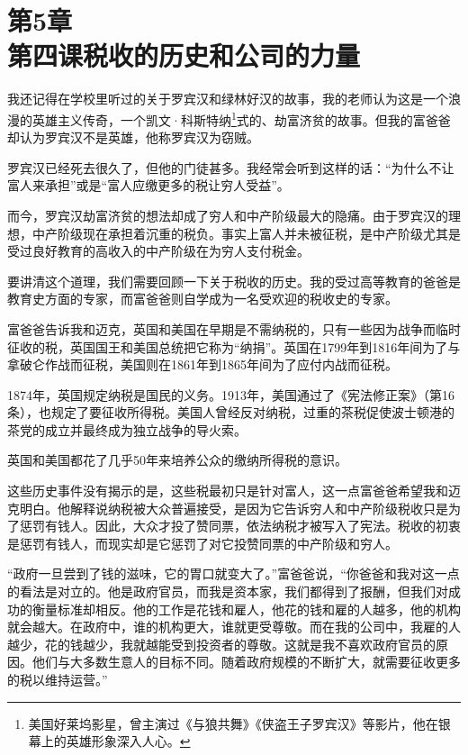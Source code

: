 \section[第5章\q 第四课\q 税收的历史和公司的力量]{第5章\\第四课\q 税收的历史和公司的力量}

我还记得在学校里听过的关于罗宾汉和绿林好汉的故事，我的老师认为这是一个浪漫的英雄主义传奇，一个凯文·科斯特纳\footnote{美国好莱坞影星，曾主演过《与狼共舞》《侠盗王子罗宾汉》等影片，他在银幕上的英雄形象深入人心。}式的、劫富济贫的故事。但我的富爸爸却认为罗宾汉不是英雄，他称罗宾汉为窃贼。

罗宾汉已经死去很久了，但他的门徒甚多。我经常会听到这样的话：“为什么不让富人来承担”或是“富人应缴更多的税让穷人受益”。

而今，罗宾汉劫富济贫的想法却成了穷人和中产阶级最大的隐痛。由于罗宾汉的理想，中产阶级现在承担着沉重的税负。事实上富人并未被征税，是中产阶级尤其是受过良好教育的高收入的中产阶级在为穷人支付税金。

要讲清这个道理，我们需要回顾一下关于税收的历史。我的受过高等教育的爸爸是教育史方面的专家，而富爸爸则自学成为一名受欢迎的税收史的专家。

富爸爸告诉我和迈克，英国和美国在早期是不需纳税的，只有一些因为战争而临时征收的税，英国国王和美国总统把它称为“纳捐”。英国在1799年到1816年间为了与拿破仑作战而征税，美国则在1861年到1865年间为了应付内战而征税。

1874年，英国规定纳税是国民的义务。1913年，美国通过了《宪法修正案》（第16条），也规定了要征收所得税。美国人曾经反对纳税，过重的茶税促使波士顿港的茶党的成立并最终成为独立战争的导火索。

英国和美国都花了几乎50年来培养公众的缴纳所得税的意识。

这些历史事件没有揭示的是，这些税最初只是针对富人，这一点富爸爸希望我和迈克明白。他解释说纳税被大众普遍接受，是因为它告诉穷人和中产阶级税收只是为了惩罚有钱人。因此，大众才投了赞同票，依法纳税才被写入了宪法。税收的初衷是惩罚有钱人，而现实却是它惩罚了对它投赞同票的中产阶级和穷人。

“政府一旦尝到了钱的滋味，它的胃口就变大了。”富爸爸说，“你爸爸和我对这一点的看法是对立的。他是政府官员，而我是资本家，我们都得到了报酬，但我们对成功的衡量标准却相反。他的工作是花钱和雇人，他花的钱和雇的人越多，他的机构就会越大。在政府中，谁的机构更大，谁就更受尊敬。而在我的公司中，我雇的人越少，花的钱越少，我就越能受到投资者的尊敬。这就是我不喜欢政府官员的原因。他们与大多数生意人的目标不同。随着政府规模的不断扩大，就需要征收更多的税以维持运营。”


